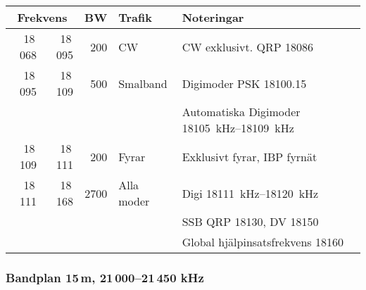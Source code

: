 \begin{tabular}{rrrll}
\multicolumn{2}{c}{\textbf{Frekvens}} & \textbf{BW} & \textbf{Trafik}
        & \textbf{Noteringar} \\ \hline
        
 18\,068 & 18\,095 & 200  & CW         & CW exklusivt. QRP \num{18086}                             \\ \hline
18\,095  & 18\,109 & 500  & Smalband   & Digimoder PSK \SI{18100,15}{}                             \\
         &         &      &            & Automatiska Digimoder \SIrange{18105}{18109}{\kilo\hertz} \\ \hline
18\,109  & 18\,111 & 200  & Fyrar      & Exklusivt fyrar, IBP fyrnät                               \\ \hline
18\,111  & 18\,168 & 2700 & Alla moder & Digi \SIrange{18111}{18120}{\kilo\hertz}                  \\
         &         &      &            & SSB QRP \num{18130}, DV \num{18150}                       \\
         &         &      &            & Global hjälpinsatsfrekvens \num{18160}                    \\ \hline
\end{tabular}

\subsubsection{Bandplan 15\,m, 21\,000--21\,450 kHz}

